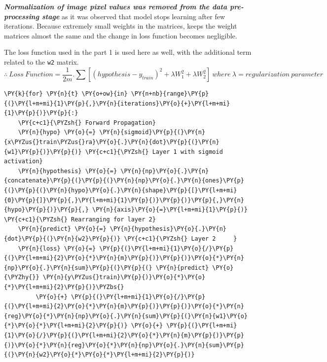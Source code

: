 \documentclass[a4paper,11pt]{article}%
\begin{document}
\textbf{\textit{Normalization of image pixel values was removed from the data pre-processing stage}} as it was observed that model stops learning after few iterations. Because extremely small weights in the matrices, keeps the weight matrices almost the same and the change in loss function becomes negligible.

The loss function used in the part 1 is used here as well, with the additional term related to the {\tt w2} matrix.
{ \scriptsize\[
	\therefore ~ Loss~ Function = \frac{1}{2m}.\sum\left[ \left( hypothesis - y_{train}\right)^2 + \lambda W_1^2 + \lambda W_2^2 \right]~ where~\lambda = regularization~parameter
	\]}


    \begin{tcolorbox}[breakable, size=fbox, boxrule=1pt, pad at break*=1mm,colback=cellbackground, colframe=cellborder]
\begin{Verbatim}[commandchars=\\\{\}]
\PY{k}{for} \PY{n}{t} \PY{o+ow}{in} \PY{n+nb}{range}\PY{p}{(}\PY{l+m+mi}{1}\PY{p}{,}\PY{n}{iterations}\PY{o}{+}\PY{l+m+mi}{1}\PY{p}{)}\PY{p}{:}
    \PY{c+c1}{\PYZsh{} Forward Propagation}
    \PY{n}{hypo} \PY{o}{=} \PY{n}{sigmoid}\PY{p}{(}\PY{n}{x\PYZus{}train\PYZus{}ra}\PY{o}{.}\PY{n}{dot}\PY{p}{(}\PY{n}{w1}\PY{p}{)}\PY{p}{)} \PY{c+c1}{\PYZsh{} Layer 1 with sigmoid activation}
    \PY{n}{hypothesis} \PY{o}{=} \PY{n}{np}\PY{o}{.}\PY{n}{concatenate}\PY{p}{(}\PY{p}{(}\PY{n}{np}\PY{o}{.}\PY{n}{ones}\PY{p}{(}\PY{p}{(}\PY{n}{hypo}\PY{o}{.}\PY{n}{shape}\PY{p}{[}\PY{l+m+mi}{0}\PY{p}{]}\PY{p}{,}\PY{l+m+mi}{1}\PY{p}{)}\PY{p}{)}\PY{p}{,}\PY{n}{hypo}\PY{p}{)}\PY{p}{,} \PY{n}{axis}\PY{o}{=}\PY{l+m+mi}{1}\PY{p}{)} \PY{c+c1}{\PYZsh{} Rearranging for layer 2}
    \PY{n}{predict} \PY{o}{=} \PY{n}{hypothesis}\PY{o}{.}\PY{n}{dot}\PY{p}{(}\PY{n}{w2}\PY{p}{)} \PY{c+c1}{\PYZsh{} Layer 2     }
    \PY{n}{loss} \PY{o}{=} \PY{p}{(}\PY{l+m+mi}{1}\PY{o}{/}\PY{p}{(}\PY{l+m+mi}{2}\PY{o}{*}\PY{n}{m}\PY{p}{)}\PY{p}{)}\PY{o}{*}\PY{n}{np}\PY{o}{.}\PY{n}{sum}\PY{p}{(}\PY{p}{(} \PY{n}{predict} \PY{o}{\PYZhy{}} \PY{n}{y\PYZus{}train}\PY{p}{)}\PY{o}{*}\PY{o}{*}\PY{l+m+mi}{2}\PY{p}{)}\PYZbs{}
         \PY{o}{+} \PY{p}{(}\PY{l+m+mi}{1}\PY{o}{/}\PY{p}{(}\PY{l+m+mi}{2}\PY{o}{*}\PY{n}{m}\PY{p}{)}\PY{p}{)}\PY{o}{*}\PY{n}{reg}\PY{o}{*}\PY{n}{np}\PY{o}{.}\PY{n}{sum}\PY{p}{(}\PY{n}{w1}\PY{o}{*}\PY{o}{*}\PY{l+m+mi}{2}\PY{p}{)} \PY{o}{+} \PY{p}{(}\PY{l+m+mi}{1}\PY{o}{/}\PY{p}{(}\PY{l+m+mi}{2}\PY{o}{*}\PY{n}{m}\PY{p}{)}\PY{p}{)}\PY{o}{*}\PY{n}{reg}\PY{o}{*}\PY{n}{np}\PY{o}{.}\PY{n}{sum}\PY{p}{(}\PY{n}{w2}\PY{o}{*}\PY{o}{*}\PY{l+m+mi}{2}\PY{p}{)}

\end{Verbatim}
\end{tcolorbox}
\end{document}
